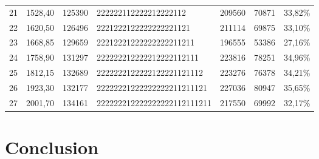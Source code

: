 \documentclass[preprint,12pt]{elsarticle}
\begin{document}
\begin{table}[htbp]
\begin{tabular}{rrrlrrr}
    21    & 1528,40 & 125390 & 222222112222212222112  & 209560 & 70871 & 33,82\% \\
    22    & 1620,50 & 126496 & 2221222122222222221121  & 211114 & 69875 & 33,10\% \\
    23    & 1668,85 & 129659 & 22212221222222222211211  & 196555 & 53386 & 27,16\% \\
    24    & 1758,90 & 131297 & 222222212222212222112111  & 223816 & 78251 & 34,96\% \\
    25    & 1812,15 & 132689 & 2222222122222122221121112 & 223276 & 76378 & 34,21\% \\
    26    & 1923,30 & 132177 & 22222221222222222211211121  & 227036 & 80947 & 35,65\% \\
    27    & 2001,70 & 134161 & 222222212222222222112111211 & 217550 & 69992 & 32,17\% \\
    \bottomrule
    \end{tabular}%
  \label{tab:deteroptimization}%
\end{table}%


\section{Conclusion}
\end{document}
